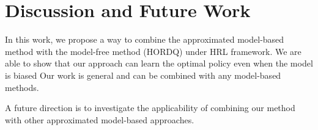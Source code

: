 \documentclass{article} %
\begin{document}


\section{Discussion and Future Work}
In this work, we propose a way to combine the approximated model-based method with the model-free
method (HORDQ) under HRL framework. We are able to show that our approach can learn the optimal
policy even when the model is biased   
Our work is general and can be combined with any model-based methods. 

A future direction is to investigate the applicability of combining our method with
other approximated model-based approaches.





{\small


}
\end{document}
